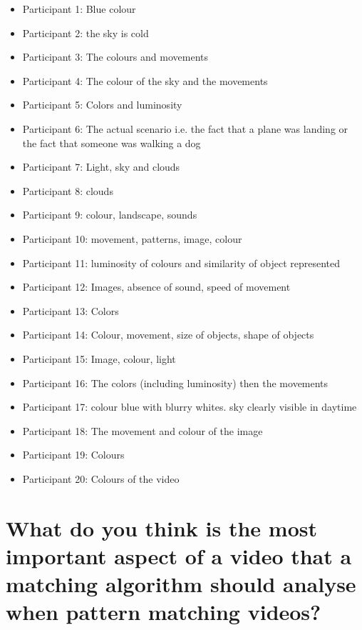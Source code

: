 \begin{itemize}
	\item Participant 1: Blue colour
    \item Participant 2: the sky is cold
    \item Participant 3: The colours and movements
    \item Participant 4: The colour of the sky and the movements
    \item Participant 5: Colors and luminosity
    \item Participant 6: The actual scenario i.e. the fact that a plane was landing or the fact that someone was walking a dog
    \item Participant 7: Light, sky and clouds
    \item Participant 8: clouds
    \item Participant 9: colour, landscape, sounds
    \item Participant 10: movement, patterns, image, colour
    \item Participant 11: luminosity of colours and similarity of object represented
    \item Participant 12: Images, absence of sound, speed of movement
    \item Participant 13: Colors
    \item Participant 14: Colour, movement, size of objects, shape of objects
    \item Participant 15: Image, colour, light
    \item Participant 16: The colors (including luminosity) then the movements
    \item Participant 17: colour blue with blurry whites. sky clearly visible in daytime
    \item Participant 18: The movement and colour of the image
    \item Participant 19: Colours
    \item Participant 20: Colours of the video
\end{itemize}

\section{What do you think is the most important aspect of a video that a matching algorithm should analyse when pattern matching videos?}


